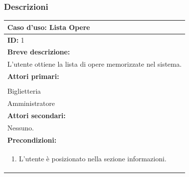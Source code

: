 \documentclass{article}
\begin{document}
            \subsubsection{Descrizioni}
                \begin{table}[H]
                    \begin{tabular}{|p{\linewidth}|}
                        \hline
                        \cellcolor{gray!100}
                        \color{white}
                        \centerline{\textbf{Caso d'uso:} Lista Opere} \\
                        \hline
                        \textbf{ID:} 1 \\
                        \hline
                        \cellcolor{gray!20}
                        \textbf{Breve descrizione:} \\
                        \cellcolor{gray!20}
                        L'utente ottiene la lista di opere memorizzate nel sistema. \\
                        \hline
                        \textbf{Attori primari:} \\
                        \begin{minipage}{\linewidth}
                            Cliente \\
                            Biglietteria \\
                            Amministratore
                        \end{minipage}
                        \vspace{0pt} \\  %
                        \hline
                        \textbf{Attori secondari:} \\
                        Nessuno. \\
                        \hline
                        \cellcolor{gray!20}
                        \textbf{Precondizioni:} \\
                        \cellcolor{gray!20}
                        \begin{minipage}{\linewidth}
                            \begin{enumerate}
                                \item L'utente è posizionato nella sezione informazioni.
                            \end{enumerate}

\end{minipage}
\end{tabular}
\end{table}
\end{document}
